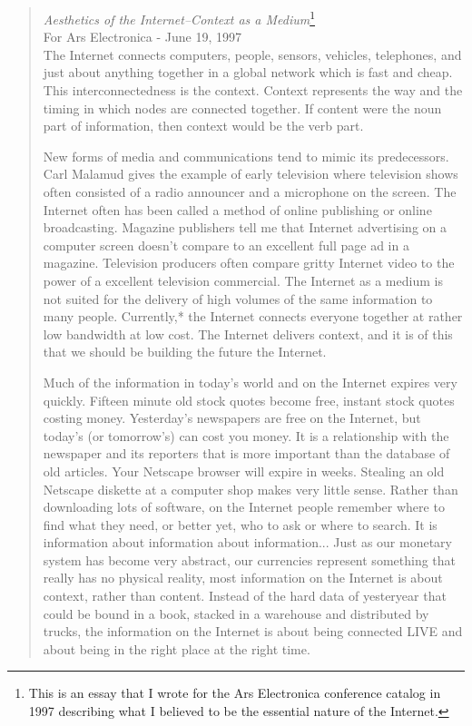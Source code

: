 \begin{quote}
\emph{Aesthetics of the Internet--Context as a Medium}\footnote{This is an essay that I wrote for the Ars Electronica conference catalog in 1997 \cite{ito1997aesthetics} describing what I believed to be the essential nature of the Internet.} \\

For Ars Electronica - June 19, 1997 \\

The Internet connects computers, people, sensors, vehicles, telephones, and just about anything together in a global network which is fast and cheap. This interconnectedness is the context. Context represents the way and the timing in which nodes are connected together. If content were the noun part of information, then context would be the verb part.

New forms of media and communications tend to mimic its predecessors. Carl Malamud gives the example of early television where television shows often consisted of a radio announcer and a microphone on the screen. The Internet often has been called a method of online publishing or online broadcasting. Magazine publishers tell me that Internet advertising on a computer screen doesn't compare to an excellent full page ad in a magazine. Television producers often compare gritty Internet video to the power of a excellent television commercial. The Internet as a medium is not suited for the delivery of high volumes of the same information to many people. Currently,* the Internet connects everyone together at rather low bandwidth at low cost. The Internet delivers context, and it is of this that we should be building the future the Internet.

Much of the information in today's world and on the Internet expires very quickly. Fifteen minute old stock quotes become free, instant stock quotes costing money. Yesterday's newspapers are free on the Internet, but today's (or tomorrow's) can cost you money. It is a relationship with the newspaper and its reporters that is more important than the database of old articles. Your Netscape browser will expire in weeks. Stealing an old Netscape diskette at a computer shop makes very little sense. Rather than downloading lots of software, on the Internet people remember where to find what they need, or better yet, who to ask or where to search. It is information about information about information... Just as our monetary system has become very abstract, our currencies represent something that really has no physical reality, most information on the Internet is about context, rather than content. Instead of the hard data of yesteryear that could be bound in a book, stacked in a warehouse and distributed by trucks, the information on the Internet is about being connected LIVE and about being in the right place at the right time.


\end{quote}
